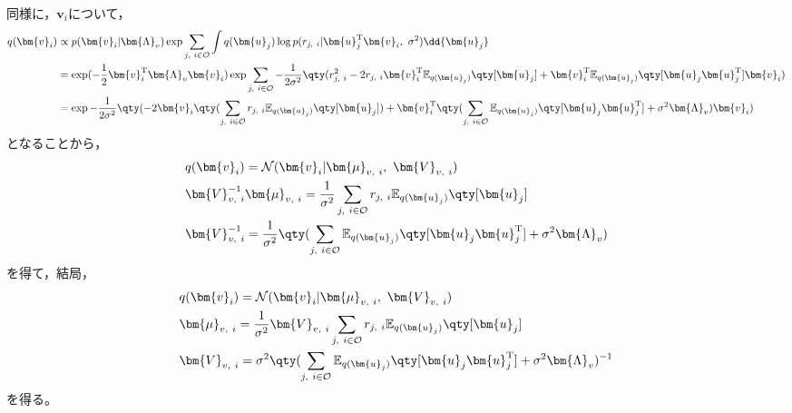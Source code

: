 \documentclass[class=jsarticle, crop=false, dvipdfmx, fleqn]{standalone}
\begin{document}
同様に，\(\bm{v}_i\)について，
\begin{align}
    q(\bm{v}_i)
        & \propto p(\bm{v}_i | \bm{\Lambda}_v) \exp{\sum_{j,\ i \in \mathcal{O}} \int q(\bm{u}_j) \log{p(r_{j,\ i} | \bm{u}_j^\mathrm{T} \bm{v}_i,\ \sigma^2)} \dd{\bm{u}_j}}
        \label{eq:q_v_margin} \\
        & = \exp(- \frac{1}{2} \bm{v}_i^\mathrm{T} \bm{\Lambda}_v \bm{v}_i) \exp{\sum_{j,\ i \in \mathcal{O}} - \frac{1}{2 \sigma^2} \qty(r_{j,\ i}^2 - 2 r_{j,\ i} \bm{v}_i^\mathrm{T} \mathbb{E}_{q(\bm{u}_j)} \qty[\bm{u}_j] + \bm{v}_i^\mathrm{T} \mathbb{E}_{q(\bm{u}_j)} \qty[\bm{u}_j \bm{u}_j^\mathrm{T}] \bm{v}_i)} \notag \\
        & = \exp{- \frac{1}{2 \sigma^2} \qty(-2\bm{v}_i \qty(\sum_{j,\ i \in \mathcal{O}} r_{j,\ i} \mathbb{E}_{q(\bm{u}_j)} \qty[\bm{u}_j]) + \bm{v}_i^\mathrm{T} \qty(\sum_{j,\ i \in \mathcal{O}} \mathbb{E}_{q(\bm{u}_j)} \qty[\bm{u}_j \bm{u}_j^\mathrm{T}] + \sigma^2 \bm{\Lambda}_v) \bm{v}_i)}
        \label{eq:q_v}
\end{align}
となることから，
\begin{align}
    & q(\bm{v}_i) = \mathcal{N}(\bm{v}_i | \bm{\mu}_{v,\ i},\ \bm{V}_{v,\ i}) \\
    & \bm{V}_{v,\ i}^{-1} \bm{\mu}_{v,\ i} = \frac{1}{\sigma^2} \sum_{j,\ i \in \mathcal{O}} r_{j,\ i} \mathbb{E}_{q(\bm{u}_j)} \qty[\bm{u}_j] \\
    & \bm{V}_{v,\ i}^{-1} = \frac{1}{\sigma^2} \qty(\sum_{j,\ i \in \mathcal{O}} \mathbb{E}_{q(\bm{u}_j)} \qty[\bm{u}_j \bm{u}_j^\mathrm{T}] + \sigma^2 \bm{\Lambda}_v)
\end{align}
を得て，結局，
\begin{align}
    & q(\bm{v}_i) = \mathcal{N}(\bm{v}_i | \bm{\mu}_{v,\ i},\ \bm{V}_{v,\ i}) \\
    & \bm{\mu}_{v,\ i} = \frac{1}{\sigma^2} \bm{V}_{v,\ i} \sum_{j,\ i \in \mathcal{O}} r_{j,\ i} \mathbb{E}_{q(\bm{u}_j)} \qty[\bm{u}_j] \\
    & \bm{V}_{v,\ i} = \sigma^2 \qty(\sum_{j,\ i \in \mathcal{O}} \mathbb{E}_{q(\bm{u}_j)} \qty[\bm{u}_j \bm{u}_j^\mathrm{T}] + \sigma^2 \bm{\Lambda}_v)^{-1}
\end{align}
を得る。
\end{document}
